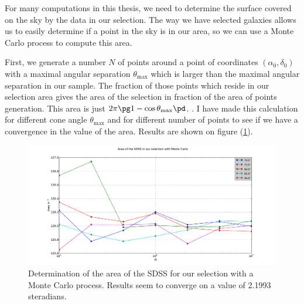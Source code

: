 For many computations in this thesis, we need to determine the surface covered on the sky by the data in our selection. The way
we have selected galaxies allows us to easily determine if a point in the sky is in our area, so we can use a Monte Carlo process
to compute this area.

First, we generate a number $N$ of points around a point of coordinates $(\alpha_0, \delta_0)$ with a maximal angular separation
$\theta_{\mathrm{max}}$ which is larger than the maximal angular separation in our sample. The fraction of those points which reside
in our selection area gives the area of the selection in fraction of the area of points generation. This area is just
$2\pi\pg1-\cos\theta_{\mathrm{max}}\pd$. . I
have made this calculation for different cone angle $\theta_{\mathrm{max}}$ and for different number of points to see if we have a
convergence in the value of the area. Results are shown on figure (\ref{fig:sdss_area}).
\begin{figure}[htb]
	\centering
	\includegraphics[width=\linewidth]{SDSS_area}
	\caption{\footnotesize{}Determination of the area of the SDSS for our selection with a Monte Carlo process. Results seem
	to converge on a value of \num{2.1993} steradians.}
	\label{fig:sdss_area}\end{figure}
